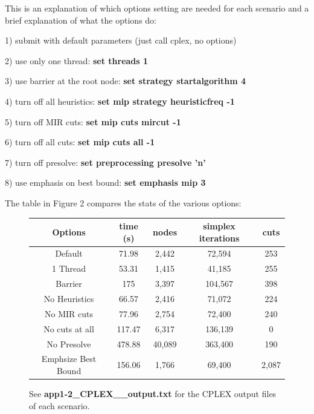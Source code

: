 \documentclass{article}
\begin{document}
\begin{itemize}
This is an explanation of which options setting are needed for each scenario and a brief explanation of what the options do:
\vspace{.2in}

 1) submit with default parameters (just call cplex, no options)
  
2) use only one thread: \textbf{set threads 1}
 
3) use barrier at the root node: \textbf{set strategy startalgorithm 4} 
	
4) turn off all heuristics: \textbf{set mip strategy heuristicfreq -1}

5) turn off MIR cuts: \textbf{set mip cuts mircut -1}
 
6) turn off all cuts: \textbf{set mip cuts all -1}

7) turn off presolve: \textbf{set preprocessing presolve 'n'}
 
8) use emphasis on best bound: \textbf{set emphasis mip 3}
\vspace{.2in}
 
The table in Figure 2 compares the stats of the various options:

\begin{center}
\begin{figure}
\begin{tabular}{||c|c|c|c|c||}\hline
\textbf{Options}	&	\textbf{time (s)}	&	\textbf{nodes}	&	\textbf{simplex iterations}		&	\textbf{cuts}	\\ \hline
Default		&	71.98	&	2,442	&	72,594	&	253		\\ \hline
1 Thread	&	53.31	&	1,415	&	41,185	&	255		\\ \hline
Barrier		&	175		&	3,397	&	104,567	&	398		\\	\hline
No Heuristics 	&	66.57	&	2,416	&	71,072	&	224		\\ \hline
No MIR cuts		&	77.96	&	2,754	&	72,400	&	240		\\ \hline
No cuts at all	&	117.47	&	6,317	&	136,139	&	0		\\ \hline
No Presolve	&	478.88	&	40,089	&	363,400	&	190		\\ \hline
Emphsize Best Bound	&	156.06	&	1,766	&	69,400	&	2,087	\\ \hline
\end{tabular}
\caption{See \textbf{app1-2\_CPLEX\_\*\_output.txt} for the CPLEX output files of each scenario.}
\end{figure}
\end{center}
\end{itemize}
\end{document}
